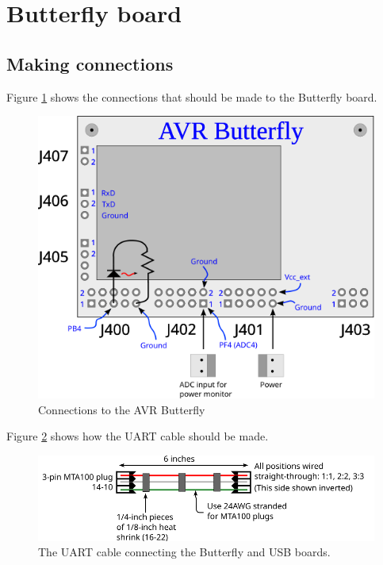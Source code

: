 \section{Butterfly board}

\subsection{Making connections}
Figure \ref{fig:bfly_connect} shows the connections that should be made to
the Butterfly board.

\begin{figure}[ht]
  \begin{center}
    \includegraphics[clip,scale=1]{figs/butterfly_connect}
    \caption{Connections to the AVR Butterfly \label{fig:bfly_connect}}
  \end{center}
\end{figure}

Figure \ref{fig:uart_cable} shows how the UART cable should be made.
\begin{figure}[ht]
  \begin{center}
    \includegraphics[clip,scale=1]{figs/uart_cable}
    \caption{The UART cable connecting the Butterfly and USB
      boards.\label{fig:uart_cable}}
  \end{center}
\end{figure}

